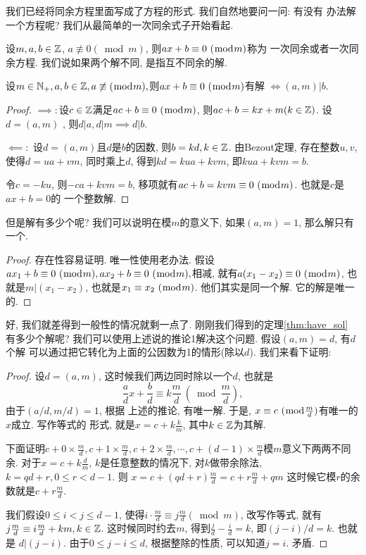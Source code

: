  我们已经将同余方程里面写成了方程的形式. 我们自然地要问一问: 有没有
办法解一个方程呢? 我们从最简单的一次同余式子开始看起. 

\begin{definition}
    设$m,a,b\in {\mathbb Z}$, $a\not \equiv 0 (\bmod m)$, 则${ax+b} \equiv {0} ~(\bmod {m})$称为
    一次同余或者一次同余方程. 我们说如果两个解不同, 是指互不同余的解. 
\end{definition}

\begin{theorem}\label{thm:have_sol}
    设$m\in \mathbb N_+, a,b\in {\mathbb Z}, a\not \equiv (\bmod m), 
    $则${ax+b} \equiv {0} ~(\bmod {m})$有解
    $\iff (a,m)|b$.  
\end{theorem}

\begin{proof}
    $\implies: $设$c\in {\mathbb Z}$满足${ac+b} \equiv {0} ~(\bmod {m})$, 则$ac+b=kx+m(k\in {\mathbb Z})$. 
    设$d=(a,m)$
    , 则$d|a, d|m \implies d|b. $ 
    
    $\impliedby: $ 设$d=(a,m)$且$d$是$b$的因数, 则$b=kd, k\in {\mathbb Z}$. 由Bezout定理, 
    存在整数$u,v$, 使得$d=ua+vm$, 同时乘上$d$, 得到$kd=kua+kvm$, 即$kua+kvm=b$. 

    令$c=-ku$, 则$-ca+kvm=b$, 移项就有$ac+b={kvm} \equiv {0} ~(\bmod {m})$. 也就是$c$是$ax+b=0$的
    一个整数解.
\end{proof}

但是解有多少个呢? 我们可以说明在模$m$的意义下, 如果$(a,m)=1$, 那么解只有一个. 
\begin{proof}
    存在性容易证明. 唯一性使用老办法. 假设${ax_1+b} \equiv {0} ~(\bmod {m}), {ax_2+b} \equiv {0} ~(\bmod {m}), $相减,
    就有${a(x_1-x_2)} \equiv {0} ~(\bmod {m})$, 也就是$m|(x_1-x_2)$, 也就是${x_1} \equiv {x_2} ~(\bmod {m})$. 
    他们其实是同一个解. 它的解是唯一的. 
\end{proof}

好, 我们就差得到一般性的情况就剩一点了. 刚刚我们得到的定理\ref{thm:have_sol}
有多少个解呢? 我们可以使用上述说的推论1解决这个问题. 假设$(a,m)=d$, 有$d$个解
可以通过把它转化为上面的公因数为1的情形(除以$d$). 我们来看下证明: 

\begin{proof}
    设$d=(a,m)$, 这时候我们两边同时除以一个$d$, 也就是$$\frac ad x + \frac bd 
    \equiv k\frac md~\left(\bmod \frac md\right),$$由于$(a/d, m/d)=1$, 根据
    上述的推论, 有唯一解. 于是, ${x} \equiv {c} ~(\bmod {m\over d})$有唯一的$x$成立. 写作等式的
    形式, 就是$x=c+k\frac km$, 其中$k\in {\mathbb Z}$为其解. 

    下面证明$c+0\times \frac md ,c+1\times \frac md ,c+2\times \frac md 
    ,\cdots, c+(d-1)\times \frac md $模$m$意义下两两不同余. 对于$x=c+k\frac dm$,
    $k$是任意整数的情况下, 对$k$做带余除法, $k=qd+r, 0\leq r<d-1$. 则
    $x=c+(qd+r)\frac md=c+r\frac md+qm$ 这时候它模$r$的余数就是$c+r\frac md$. 

    我们假设$0\leq i<j\leq d-1$, 使得$i\cdot \frac md \equiv j \frac md 
    (\bmod m)$, 改写作等式, 就有$j\frac md \equiv i \frac md + km, k\in {\mathbb Z}$. 
    这时候同时约去$m$, 得到$\frac jd - \frac id = k$, 即$(j-i)/d=k$. 也就是
    $d|(j-i)$. 由于$0\leq j-i \leq d $, 根据整除的性质, 可以知道$j=i$. 矛盾. 
\end{proof}

